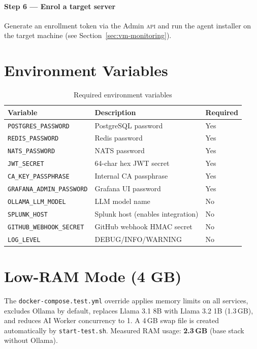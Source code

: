 \paragraph{Step 6 — Enrol a target server}
Generate an enrollment token via the Admin \textsc{api} and run the agent
installer on the target machine (see Section~\ref{sec:vm-monitoring}).

\section{Environment Variables}

\begin{table}[H]
\centering
\caption{Required environment variables}
\label{tab:env-vars}
\small
\begin{tabularx}{\textwidth}{lXl}
\toprule
\textbf{Variable} & \textbf{Description} & \textbf{Required} \\
\midrule
\texttt{POSTGRES\_PASSWORD}    & PostgreSQL password            & Yes \\
\texttt{REDIS\_PASSWORD}       & Redis password                 & Yes \\
\texttt{NATS\_PASSWORD}        & NATS password                  & Yes \\
\texttt{JWT\_SECRET}           & 64-char hex JWT secret         & Yes \\
\texttt{CA\_KEY\_PASSPHRASE}   & Internal CA passphrase         & Yes \\
\texttt{GRAFANA\_ADMIN\_PASSWORD} & Grafana UI password         & Yes \\
\texttt{OLLAMA\_LLM\_MODEL}    & LLM model name                 & No \\
\texttt{SPLUNK\_HOST}          & Splunk host (enables integration) & No \\
\texttt{GITHUB\_WEBHOOK\_SECRET} & GitHub webhook HMAC secret   & No \\
\texttt{LOG\_LEVEL}            & DEBUG/INFO/WARNING             & No \\
\bottomrule
\end{tabularx}
\end{table}

\section{Low-RAM Mode (4 GB)}

The \texttt{docker-compose.test.yml} override applies memory limits on all services,
excludes Ollama by default, replaces Llama 3.1 8B with Llama 3.2 1B (1.3\,GB),
and reduces AI Worker concurrency to 1. A 4\,GB swap file is created automatically
by \texttt{start-test.sh}. Measured RAM usage: \textbf{2.3\,GB} (base stack without Ollama).

